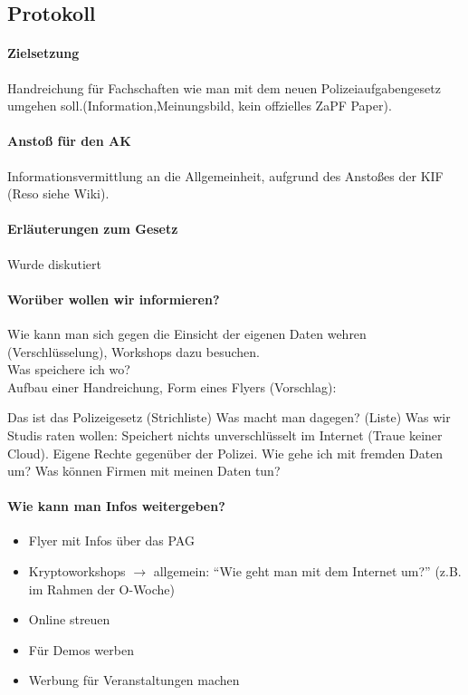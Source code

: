  \subsection*{Protokoll}
    \paragraph{Zielsetzung}
      Handreichung für Fachschaften wie man mit dem neuen Polizeiaufgabengesetz umgehen soll.(Information,Meinungsbild, kein offzielles ZaPF Paper).

    \paragraph{Anstoß für den AK}
      Informationsvermittlung an die Allgemeinheit, aufgrund des Anstoßes der KIF (Reso siehe Wiki).

    \paragraph{Erläuterungen zum Gesetz}
      Wurde diskutiert

    \paragraph{Worüber wollen wir informieren?}
      Wie kann man sich gegen die Einsicht der eigenen Daten wehren (Verschlüsselung), Workshops dazu besuchen. \\
      Was speichere ich wo? \\

      Aufbau einer Handreichung, Form eines Flyers (Vorschlag):
      \begin{outline}
        \1 Das ist das Polizeigesetz (Strichliste)
        \1 Was macht man dagegen? (Liste)
        \1 Was wir Studis raten wollen:
          \2 Speichert nichts unverschlüsselt im Internet (Traue keiner Cloud).
          \2 Eigene Rechte gegenüber der Polizei.
          \2 Wie gehe ich mit fremden Daten um?
          \2 Was können Firmen mit meinen Daten tun?
      \end{outline}

    \paragraph{Wie kann man Infos weitergeben?}
      \begin{itemize}
        \item Flyer mit Infos über das PAG
        \item Kryptoworkshops $\rightarrow$ allgemein: ``Wie geht man mit dem Internet um?''  (z.B. im Rahmen der O-Woche)
        \item Online streuen
        \item Für Demos werben
        \item Werbung für Veranstaltungen machen
      \end{itemize}
